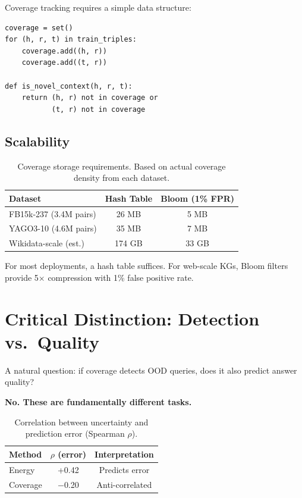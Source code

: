 \documentclass{article}
\begin{document}
Coverage tracking requires a simple data structure:
\begin{verbatim}
coverage = set()
for (h, r, t) in train_triples:
    coverage.add((h, r))
    coverage.add((t, r))

def is_novel_context(h, r, t):
    return (h, r) not in coverage or
           (t, r) not in coverage
\end{verbatim}

\subsection{Scalability}

\begin{table}[h]
\centering
\caption{Coverage storage requirements. Based on actual coverage density from each dataset.}
\begin{tabular}{lcc}
\toprule
Dataset & Hash Table & Bloom (1\% FPR) \\
\midrule
FB15k-237 (3.4M pairs) & 26 MB & 5 MB \\
YAGO3-10 (4.6M pairs) & 35 MB & 7 MB \\
Wikidata-scale (est.) & 174 GB & 33 GB \\
\bottomrule
\end{tabular}
\end{table}

For most deployments, a hash table suffices. For web-scale KGs, Bloom filters provide 5$\times$ compression with 1\% false positive rate.

\section{Critical Distinction: Detection vs.\ Quality}
\label{sec:distinction}

A natural question: if coverage detects OOD queries, does it also predict answer quality?

\textbf{No. These are fundamentally different tasks.}

\begin{table}[h]
\centering
\caption{Correlation between uncertainty and prediction error (Spearman $\rho$).}
\begin{tabular}{lcc}
\toprule
Method & $\rho$ (error) & Interpretation \\
\midrule
Energy & +0.42 & Predicts error \\
Coverage & $-$0.20 & Anti-correlated \\
\bottomrule
\end{tabular}
\end{table}
\end{document}
